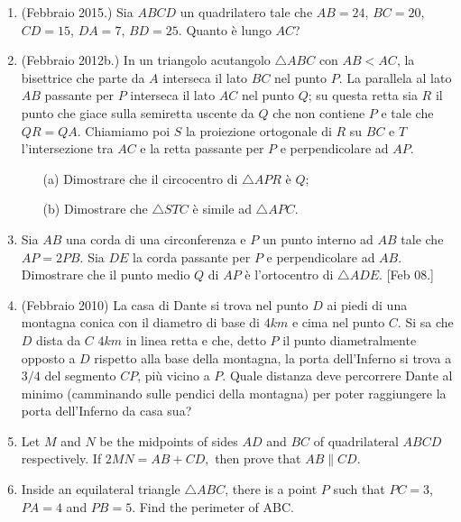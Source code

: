 \documentclass[a4paper]{article}
\theoremstyle{remark}
\theoremstyle{definition}
\begin{document}
\begin{enumerate}

\item (Febbraio 2015.)  Sia $ ABCD $ un quadrilatero tale che $ AB = 24 $, $ BC = 20 $, $ CD = 15 $, $ DA = 7 $, $ BD = 25 $. Quanto è lungo $ AC $?

\item (Febbraio 2012b.) In un triangolo acutangolo $ \bigtriangleup ABC $ con $ AB < AC $, la bisettrice che parte da $ A $ interseca il lato $ BC $ nel punto $ P $. La parallela al lato $ AB $ passante per $ P $ interseca il lato $ AC $ nel punto $ Q $; su questa retta sia $ R $ il punto che giace sulla semiretta uscente da $ Q $ che non contiene $ P $ e tale che $ QR = QA $. Chiamiamo poi $ S $ la proiezione ortogonale di $ R $ su $ BC $ e $ T $ l’intersezione tra $ AC $ e la retta passante per $ P $ e perpendicolare ad $ AP $.
\begin{itemize}
	\item [(a)] Dimostrare che il circocentro di $ \bigtriangleup APR $ è $ Q $;
	\item [(b)] Dimostrare che $ \triangle STC $ è simile ad $ \triangle APC $. 
\end{itemize}

\item  Sia $ AB $ una corda di una circonferenza e $ P $ un punto interno ad $ AB $ tale che $ AP = 2PB $. Sia $ DE $ la corda passante per $ P $ e perpendicolare ad $ AB $. Dimostrare che il punto medio $ Q $ di $ AP $ è l’ortocentro di $ \bigtriangleup ADE $. [Feb 08.]

\item (Febbraio 2010) La casa di Dante si trova nel punto $ D $ ai piedi di una montagna conica con il diametro di base di $ 4 km $ e cima nel punto $ C $. Si sa che $ D $ dista da $ C $ $ 4 km $ in linea retta e che, detto $ P $ il punto diametralmente opposto a $ D $ rispetto alla base della montagna, la porta dell’Inferno si trova a $ 3/4 $ del segmento $ CP $, più vicino a $ P $. Quale distanza deve percorrere Dante al minimo (camminando sulle pendici della montagna) per poter raggiungere la porta dell’Inferno da casa sua?

\item Let $ M $ and $ N $ be the midpoints of sides $ AD $ and $ BC $ of
quadrilateral $ ABCD $ respectively. If
$  2MN = AB+CD,  $
then prove that $ AB\parallel CD $.

\item Inside an equilateral
triangle $ \triangle ABC $, there is a point $ P $ such
that $ PC=3 $, $ PA=4 $ and $ PB=5 $. Find the
perimeter of ABC.


\end{enumerate}
\end{document}

